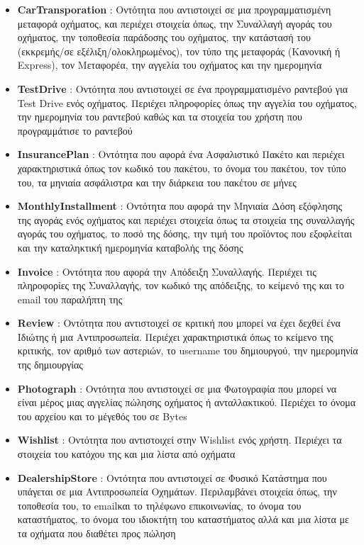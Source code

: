 \documentclass{../ol-softwaremanual}
\begin{document}
\begin{itemize}
		\item \en \textbf{CarTransporation} \gr : Οντότητα που αντιστοιχεί σε μια προγραμματισμένη μεταφορά οχήματος, και περιέχει στοιχεία όπως, την Συναλλαγή αγοράς του οχήματος, την τοποθεσία παράδοσης του οχήματος, την κατάστασή του (εκκρεμής/σε εξέλιξη/ολοκληρωμένος), τον τύπο της μεταφοράς (Κανονική ή \en Express\gr), τον Μεταφορέα, την αγγελία του οχήματος και την ημερομηνία 
		\item \en \textbf{TestDrive} \gr : Οντότητα που αντιστοιχεί σε ένα προγραμματισμένο ραντεβού για \en Test Drive \gr ενός οχήματος. Περιέχει πληροφορίες όπως την αγγελία του οχήματος, την ημερομηνία του ραντεβού καθώς και τα στοιχεία του χρήστη που προγραμμάτισε το ραντεβού
		\item \en \textbf{InsurancePlan} \gr : Οντότητα που αφορά ένα Ασφαλιστικό Πακέτο και περιέχει χαρακτηριστικά όπως τον κωδικό του πακέτου, το όνομα του πακέτου, τον τύπο του, τα μηνιαία ασφάλιστρα και την διάρκεια του πακέτου σε μήνες
		\item \en \textbf{MonthlyInstallment} \gr : Οντότητα που αφορά την Μηνιαία Δόση εξόφλησης της αγοράς ενός οχήματος και περιέχει στοιχεία όπως τα στοιχεία της συναλλαγής αγοράς του οχήματος, το ποσό της δόσης, την τιμή του προϊόντος που εξοφλείται και την καταληκτική ημερομηνία καταβολής της δόσης
		\item \en \textbf{Invoice} \gr : Οντότητα που αφορά την Απόδειξη Συναλλαγής. Περιέχει τις πληροφορίες της Συναλλαγής, τον κωδικό της απόδειξης, το κείμενό της και το \en email \gr του παραλήπτη της	
		\item \en \textbf{Review} \gr : Οντότητα που αντιστοιχεί σε κριτική που μπορεί να έχει δεχθεί ένα Ιδιώτης ή μια Αντιπροσωπεία. Περιέχει χαρακτηριστικά όπως το κείμενο της κριτικής, τον αριθμό των αστεριών, το \en username \gr του δημιουργού, την ημερομηνία της δημιουργίας
		\item \en \textbf{Photograph} \gr : Οντότητα που αντιστοιχεί σε μια Φωτογραφία που μπορεί να είναι μέρος μιας αγγελίας πώλησης οχήματος ή ανταλλακτικού. Περιέχει το όνομα του αρχείου και το μέγεθός του σε \en Bytes \gr
		\item \en \textbf{Wishlist} \gr : Οντότητα που αντιστοιχεί στην \en Wishlist \gr ενός χρήστη. Περιέχει τα στοιχεία του κατόχου της και μια λίστα από οχήματα
		\item \en \textbf{DealershipStore} \gr : Οντότητα που αντιστοιχεί σε Φυσικό Κατάστημα που υπάγεται σε μια Αντιπροσωπεία Οχημάτων. Περιλαμβάνει στοιχεία όπως, την τοποθεσία του, το \en email\gr και το τηλέφωνο επικοινωνίας, το όνομα του καταστήματος, το όνομα του ιδιοκτήτη του καταστήματος αλλά και μια λίστα με τα οχήματα που διαθέτει προς πώληση
	\end{itemize}
	
	
	
	
	
\end{document}
